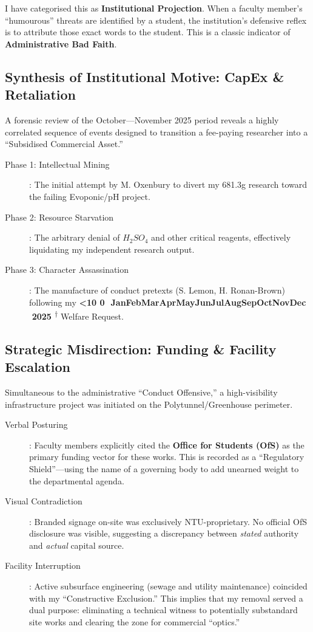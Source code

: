 \documentclass{EMBASSY}
\DeclareRobustCommand{\gmt}[3]{%
    \texorpdfstring{%
        {\color{DateGold}\textbf{%
            \ifnum#1<10 0\fi#1\,\textperiodcentered\,%
            \ifcase#2\or Jan\or Feb\or Mar\or Apr\or May\or Jun\or Jul\or Aug\or Sep\or Oct\or Nov\or Dec\fi
            \,\textperiodcentered\,20#3%
            \textsuperscript{$\dagger$}%
        }}%
    }{%
        (#1/#2/#3)%
    }%
}
\begin{document}
\noindent I have categorised this as \textbf{Institutional Projection}. When a faculty member's ``humourous'' threats are identified by a student, the institution’s defensive reflex is to attribute those exact words to the student. This is a classic indicator of \textbf{Administrative Bad Faith}.

\subsection{Synthesis of Institutional Motive: CapEx \& Retaliation}
A forensic review of the October---November 2025 period reveals a highly correlated sequence of events designed to transition a fee-paying researcher into a ``Subsidised Commercial Asset.''

\begin{description}
	\item[Phase 1: Intellectual Mining]: The initial attempt by M. Oxenbury to divert my 681.3g research toward the failing Evoponic/pH project.
	\item[Phase 2: Resource Starvation]: The arbitrary denial of $H_{2}SO_{4}$ and other critical reagents, effectively liquidating my independent research output.
	\item[Phase 3: Character Assassination]: The manufacture of conduct pretexts (S. Lemon, H. Ronan-Brown) following my \gmt{31}{10}{25} Welfare Request.
\end{description}

\subsection{Strategic Misdirection: Funding \& Facility Escalation}
Simultaneous to the administrative ``Conduct Offensive,'' a high-visibility infrastructure project was initiated on the Polytunnel/Greenhouse perimeter.

\begin{description}
	\item[Verbal Posturing]: Faculty members explicitly cited the \textbf{Office for Students (OfS)} as the primary funding vector for these works. This is recorded as a ``Regulatory Shield''---using the name of a governing body to add unearned weight to the departmental agenda.
	\item[Visual Contradiction]: Branded signage on-site was exclusively NTU-proprietary. No official OfS disclosure was visible, suggesting a discrepancy between \textit{stated} authority and \textit{actual} capital source.
	\item[Facility Interruption]: Active subsurface engineering (sewage and utility maintenance) coincided with my ``Constructive Exclusion.'' This implies that my removal served a dual purpose: eliminating a technical witness to potentially substandard site works and clearing the zone for commercial ``optics.''
\end{description}
\end{document}
